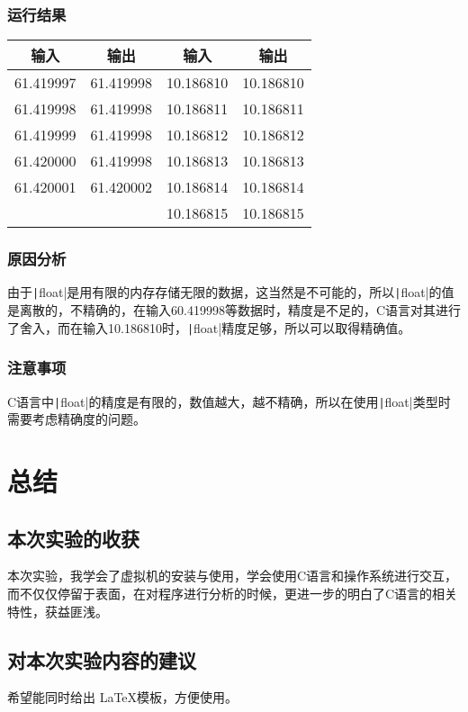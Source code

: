 \subsubsection{运行结果}
\begin{tabular}{|c|c|c|c|}
	\hline 
	输入 & 输出 & 输入 & 输出 \\ 
	\hline 
	61.419997 & 61.419998 & 10.186810 & 10.186810 \\ 
	\hline 
	61.419998 & 61.419998 & 10.186811 & 10.186811 \\ 
	\hline 
	61.419999 & 61.419998 & 10.186812 & 10.186812 \\ 
	\hline 
	61.420000 & 61.419998 & 10.186813 & 10.186813 \\ 
	\hline 
	61.420001 & 61.420002 & 10.186814 & 10.186814 \\ 
	\hline
	          &           & 10.186815 & 10.186815 \\ 
	\hline 
\end{tabular} 

\subsubsection{原因分析}
由于\texttt|float|是用有限的内存存储无限的数据，这当然是不可能的，所以\texttt|float|的值是离散的，不精确的，在输入60.419998等数据时，精度是不足的，C语言对其进行了舍入，而在输入10.186810时，\texttt|float|精度足够，所以可以取得精确值。

\subsubsection{注意事项}
C语言中\texttt|float|的精度是有限的，数值越大，越不精确，所以在使用\texttt|float|类型时需要考虑精确度的问题。


\section{总结}
\subsection{本次实验的收获}
本次实验，我学会了虚拟机的安装与使用，学会使用C语言和操作系统进行交互，而不仅仅停留于表面，在对程序进行分析的时候，更进一步的明白了C语言的相关特性，获益匪浅。

\subsection{对本次实验内容的建议} 
希望能同时给出 \LaTeX 模板，方便使用。


